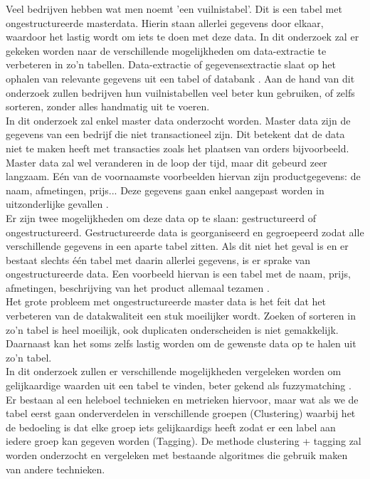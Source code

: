%
\label{sec:introductie}
Veel bedrijven hebben wat men noemt 'een vuilnistabel'. Dit is een tabel met ongestructureerde masterdata. Hierin staan allerlei gegevens door elkaar, waardoor het lastig wordt om iets te doen met deze data. In dit onderzoek zal er gekeken worden naar de verschillende mogelijkheden om data-extractie te verbeteren in zo'n tabellen. Data-extractie of gegevensextractie slaat op het ophalen van relevante gegevens uit een tabel of databank \autocite{Encyclo.nl}. Aan de hand van dit onderzoek zullen bedrijven hun vuilnistabellen veel beter kun gebruiken, of zelfs sorteren, zonder alles handmatig uit te voeren.
\\\indent
In dit onderzoek zal enkel master data onderzocht worden. Master data zijn de gegevens van een bedrijf die niet transactioneel zijn. Dit betekent dat de data niet te maken heeft met transacties zoals het plaatsen van orders bijvoorbeeld. Master data zal wel veranderen in de loop der tijd, maar dit gebeurd zeer langzaam. Eén van de voornaamste voorbeelden hiervan zijn productgegevens: de naam, afmetingen, prijs... Deze gegevens gaan enkel aangepast worden in uitzonderlijke gevallen \autocite{Yellowground}.
\\\indent
Er zijn twee mogelijkheden om deze data op te slaan: gestructureerd of ongestructureerd. Gestructureerde data is georganiseerd en gegroepeerd zodat alle verschillende gegevens in een aparte tabel zitten. Als dit niet het geval is en er bestaat slechts één tabel met daarin allerlei gegevens, is er sprake van ongestructureerde data. Een voorbeeld hiervan is een tabel met de naam, prijs, afmetingen, beschrijving van het product allemaal tezamen \autocite{Seagate}.
\\\indent
Het grote probleem met ongestructureerde master data is het feit dat het verbeteren van de datakwaliteit een stuk moeilijker wordt. Zoeken of sorteren in zo'n tabel is heel moeilijk, ook duplicaten onderscheiden is niet gemakkelijk. Daarnaast kan het soms zelfs lastig worden om de gewenste data op te halen uit zo'n tabel.
\\\indent
In dit onderzoek zullen er verschillende mogelijkheden vergeleken worden om gelijkaardige waarden uit een tabel te vinden, beter gekend als fuzzymatching \autocite{Silva2022}. Er bestaan al een heleboel technieken en metrieken hiervoor, maar wat als we de tabel eerst gaan onderverdelen in verschillende groepen (Clustering) waarbij het de bedoeling is dat elke groep iets gelijkaardigs heeft zodat er een label aan iedere groep kan gegeven worden (Tagging). De methode clustering + tagging zal worden onderzocht en vergeleken met bestaande algoritmes die gebruik maken van andere technieken.
